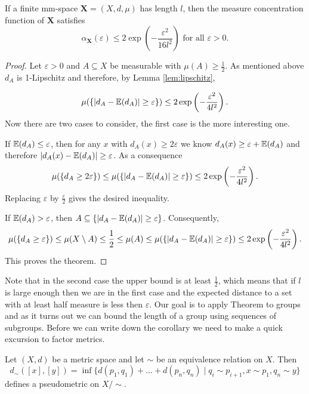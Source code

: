 \begin{theorem}\label{thm:measureConcetration}
If a finite mm-space $\boldsymbol{X}=(X,d,\mu)$ has length $l$, then the measure concentration function of $\boldsymbol X$ satisfies
\[\alpha_{\boldsymbol{X}}(\varepsilon)\leq 2\exp\left(-\frac{\varepsilon^2}{16l^2}\right)\text{ for all $\varepsilon>0$}.\]
\end{theorem}
\begin{proof}
Let $\varepsilon>0$ and $A\subseteq X$ be measurable with $\mu(A)\geq\frac{1}{2}$. As mentioned above $d_A$ is 1-Lipschitz and therefore, by Lemma \ref{lem:lipschitz},

\[\mu(\{|d_A-\mathbb{E}(d_A)|\geq\varepsilon\})\leq 2\exp\left(-\frac{\varepsilon^2}{4l^2}\right).\]
Now there are two cases to consider, the first case is the more interesting one.

If $\mathbb{E}(d_A)\leq\varepsilon$, then for any $x$ with $d_A(x)\geq2\varepsilon$ we know $d_A(x)\geq \varepsilon+\mathbb{E}(d_A)$ and therefore $|d_A(x)-\mathbb{E}(d_A)|\geq \varepsilon$. As a consequence %
\[\mu(\{d_A\geq2\varepsilon\})\leq \mu(\{|d_A-\mathbb{E}(d_A)|\geq\varepsilon\})\leq2\exp\left(-\frac{\varepsilon^2}{4l^2}\right) .\]
Replacing $\varepsilon$ by $\frac{\varepsilon}{2}$ gives the desired inequality.

If $\mathbb{E}(d_A)>\varepsilon$, then $A\subseteq \{|d_A-\mathbb{E}(d_A)|\geq\varepsilon\}$. Consequently,
\[\mu(\{d_A\geq\varepsilon\})\leq \mu(X\setminus A)\leq \frac{1}{2}\leq \mu(A)\leq \mu(\{|d_A-\mathbb{E}(d_A)|\geq\varepsilon\})\leq 2\exp\left(-\frac{\varepsilon^2}{4l^2}\right).\]
This proves the theorem.
\end{proof}
Note that in the second case the upper bound is at least $\frac{1}{2}$, which means that if $l$ is large enough then we are in the first case and the expected distance to a set with at least half measure is less then $\varepsilon$. 
Our goal is to apply Theorem to groups and as it turns out we can bound the length of a group using sequences of subgroups. Before we can write down the corollary we need to make a quick excursion to factor metrics. 

\begin{definition}
Let $(X,d)$ be a metric space and let $\sim$ be an equivalence relation on $X$. Then \[d_\sim([x],[y])=\inf\{d(p_1,q_1)+\dots+d(p_n,q_n)\mid q_i\sim p_{i+1}, x\sim p_1, q_n\sim y\}\] defines a pseudometric on $X/{\sim}$.
\end{definition}

